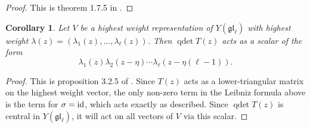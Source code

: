 \documentclass[11pt]{report}
\newtheorem{corollary}[theorem]{Corollary}
\theoremstyle{definition}
\theoremstyle{remark}
\theoremstyle{remark}
\newcommand{\id}{\textnormal{id}}
\begin{document}
\begin{proof}
This is theorem 1.7.5 in \cite{book:molev}.
\end{proof}

\begin{corollary}\label{corollary:quantumDet}
Let $V$ be a highest weight representation of $Y(\mathfrak{gl}_\ell)$ with highest weight $\lambda(z) = (\lambda_1(z),...,\lambda_\ell(z))$. Then $\operatorname{qdet} T(z)$ acts as a scalar of the form
\begin{equation*}
\lambda_1(z) \lambda_2(z-\eta) \cdots \lambda_\ell(z-\eta(\ell-1)).
\end{equation*}
\end{corollary}

\begin{proof}
This is proposition 3.2.5 of \cite{book:molev}. Since $T(z)$ acts as a lower-triangular matrix on the highest weight vector, the only non-zero term in the Leibniz formula above is the term for $\sigma = \id$, which acts exactly as described. Since $\operatorname{qdet} T(z)$ is central in $Y(\mathfrak{gl}_\ell)$, it will act on all vectors of $V$ via this scalar.
\end{proof}
\end{document}
